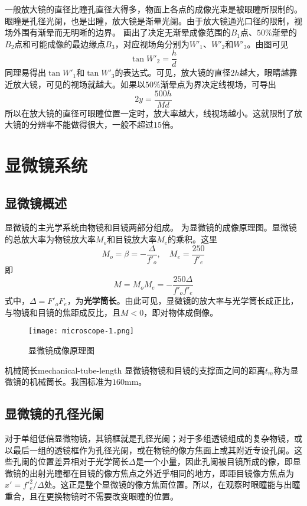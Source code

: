 一般放大镜的直径比瞳孔直径大得多，物面上各点的成像光束是被眼瞳所限制的。眼瞳是孔径光阑，也是出瞳，放大镜是渐晕光阑。由于放大镜通光口径的限制，视场外围有渐晕而无明晰的边界。 画出了决定无渐晕成像范围的$B_1$点、$50\%$渐晕的$B_2$点和可能成像的最边缘点$B_3$，对应视场角分别为$W'_1$、$W'_2$和$W'_3$。由图可见
\begin{equation}
\tan W'_2=\frac{h}{d}
\end{equation}
同理易得出$\tan W'_1$和$\tan W'_3$的表达式。可见，放大镜的直径$2h$越大，眼睛越靠近放大镜，可见的视场就越大。如果以$50\%$渐晕点为界决定线视场，可导出
\begin{equation}
2y=\frac{500h}{Md}
\end{equation}
所以在放大镜的直径可眼瞳位置一定时，放大率越大，线视场越小。这就限制了放大镜的分辨率不能做得很大，一般不超过$15$倍。

\section{显微镜系统}
\label{sect:microscope}
\subsection{显微镜概述}
显微镜的主光学系统由物镜和目镜两部分组成。 为显微镜的成像原理图。显微镜的总放大率为物镜放大率$M_o$和目镜放大率$M_e$的乘积。这里
\begin{equation}
M_o=\beta=-\frac{\varDelta}{f'_o},\quad M_e=\frac{250}{f'_e}
\end{equation}
即
\begin{equation}
M=M_oM_e=-\frac{250\varDelta}{f'_of'_e}
\end{equation}
式中，$\varDelta=F'_oF_e$，为\textbf{光学筒长}。由此可见，显微镜的放大率与光学筒长成正比，与物镜和目镜的焦距成反比，且$M<0$，即对物体成倒像。

\begin{figure}[htbp]
	\centering
	\texttt{[image: microscope-1.png]}
	\caption{显微镜成像原理图}
	\label{fig:microscope-1}
\end{figure}

\begin{definition}{机械筒长}{mechanical-tube-length}
	显微镜物镜和目镜的支撑面之间的距离$t_m$称为显微镜的机械筒长。我国标准为$160\mathrm{mm}$。
\end{definition}

\subsection{显微镜的孔径光阑}
对于单组低倍显微物镜，其镜框就是孔径光阑；对于多组透镜组成的复杂物镜，或以最后一组的透镜框作为孔径光阑，或在物镜的像方焦面上或其附近专设孔阑。这些孔阑的位置差异相对于光学筒长$\varDelta$是一个小量，因此孔阑被目镜所成的像，即显微镜的出射光瞳都在目镜的像方焦点之外近乎相同的地方，即距目镜像方焦点为$x'=f'^2_e/\varDelta$处。这正是整个显微镜的像方焦面位置。所以，在观察时眼瞳能与出瞳重合，且在更换物镜时不需要改变眼瞳的位置。

